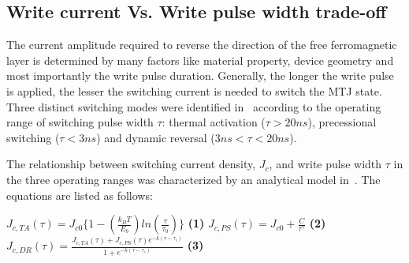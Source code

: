 \subsection{Write current Vs. Write pulse width trade-off} \label{subsec:ict}


The current amplitude required to reverse the direction of the free ferromagnetic layer is determined
by many factors like material property, device geometry and most importantly the write pulse
duration. Generally, the longer the write pulse is applied, the lesser the switching current is
needed to switch the MTJ state. Three distinct switching modes were identified in~\cite{STTRAM:JAP07}
according to the operating range of switching pulse width $\tau$: thermal activation ($\tau>20ns$),
precessional switching ($\tau<3ns$) and dynamic reversal ($3ns<\tau<20ns$).

The relationship between switching current density, $J_{c}$, and write pulse width $\tau$ in the
three operating ranges was characterized by an analytical model in~\cite{STTRAM:IEDM09}. The
equations are listed as follows:

 {
 \small{
\noindent $J_{c,TA}(\tau) = J_{c0}\{1- (\frac{k_{B}T}{E_{b}})ln(\frac{\tau}{\tau_{0}})\}$
\hspace{1mm} \textbf{(1)} \hspace{1mm} $J_{c,PS}(\tau) = J_{c0}+ \frac{C}{\tau^{\gamma}}$
\hspace{1mm} \textbf{(2)} \hspace{1mm} $J_{c,DR}(\tau) =
\frac{J_{c,TA}(\tau)+J_{c,PS}(\tau)e^{-k(\tau - \tau_{c})}}{1+e^{-k(\tau - \tau_{c})}}$ \hspace{1mm}
\textbf{(3)}
 }
 }

